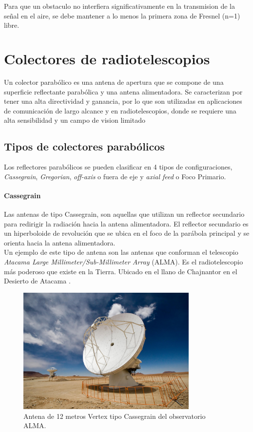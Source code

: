 Para que un obstaculo no interfiera significativamente en la transmision de la señal en el aire, se debe mantener a lo menos la primera zona de Fresnel (n=1) libre.

\section{Colectores de radiotelescopios}

Un colector parabólico es una antena de apertura que se compone de una superficie reflectante parabólica y una antena alimentadora. Se caracterizan por tener una alta directividad y ganancia, por lo que son utilizadas en aplicaciones de comunicación de largo alcance y en radiotelescopios, donde se requiere una alta sensibilidad y un campo de vision limitado\\


\subsection{Tipos de colectores parabólicos}

Los reflectores parabólicos se pueden clasificar en 4 tipos de configuraciones, \textit{Cassegrain}, \textit{Gregorian}, \textit{off-axis} o fuera de eje y \textit{axial feed} o Foco Primario.\\

\paragraph{Cassegrain}

Las antenas de tipo Cassegrain, son aquellas que utilizan un reflector secundario para redirigir la radiación hacia la antena alimentadora. El reflector secundario es un hiperboloide de revolución que se ubica en el foco de la parábola principal y se orienta hacia la antena alimentadora.\\

Un ejemplo de este tipo de antena son las antenas que conforman el telescopio \textit{Atacama Large Millimeter/Sub-Millimeter Array} (ALMA). Es el radiotelescopio más poderoso que existe en la Tierra. Ubicado en el llano de Chajnantor en el Desierto de Atacama \cite{alma}.

\begin{figure}
    \centering
    \includegraphics[width = 0.8\textwidth]{img/cassegrain.jpg}
    \caption{Antena de 12 metros Vertex tipo Cassegrain del observatorio ALMA.}
    \label{fig:cass}
\end{figure}


